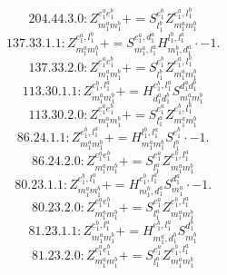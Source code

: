\documentclass[letterpaper,10pt,fleqn,leqno,onecolumn]{article}
\begin{document}
\begin{equation} \;\;\;\;\;\;  204.44.3.0: Z^{e_{1}^{a}e_{1}^{b}}_{m_{1}^{a}m_{1}^{b}}+=S^{e_{1}^{b}}_{l_{1}^{b}}Z^{e_{1}^{a},l_{1}^{b}}_{m_{1}^{a}m_{1}^{b}} \end{equation}
\begin{equation} \;\;\;\;\;\;  137.33.1.1: Z^{e_{1}^{a},l_{1}^{b}}_{m_{1}^{a}m_{1}^{b}}+=S^{e_{1}^{a},d_{1}^{a}}_{m_{1}^{a},l_{1}^{a}}H^{l_{1}^{b},l_{1}^{a}}_{m_{1}^{b},d_{1}^{a}}\cdot -1. \end{equation}
\begin{equation} \;\;\;\;\;\;  137.33.2.0: Z^{e_{1}^{a}e_{1}^{b}}_{m_{1}^{a}m_{1}^{b}}+=S^{e_{1}^{b}}_{l_{1}^{b}}Z^{e_{1}^{a},l_{1}^{b}}_{m_{1}^{a}m_{1}^{b}} \end{equation}
\begin{equation} \;\;\;\;\;\;  113.30.1.1: Z^{e_{1}^{b},l_{1}^{a}}_{m_{1}^{a}m_{1}^{b}}+=H^{e_{1}^{b},l_{1}^{a}}_{d_{1}^{a}d_{1}^{b}}S^{d_{1}^{a}d_{1}^{b}}_{m_{1}^{a}m_{1}^{b}} \end{equation}
\begin{equation} \;\;\;\;\;\;  113.30.2.0: Z^{e_{1}^{a}e_{1}^{b}}_{m_{1}^{a}m_{1}^{b}}+=S^{e_{1}^{a}}_{l_{1}^{a}}Z^{e_{1}^{b},l_{1}^{a}}_{m_{1}^{a}m_{1}^{b}} \end{equation}
\begin{equation} \;\;\;\;\;\;  86.24.1.1: Z^{e_{1}^{b},l_{1}^{a}}_{m_{1}^{a}m_{1}^{b}}+=H^{l_{1}^{b},l_{1}^{a}}_{m_{1}^{a}m_{1}^{b}}S^{e_{1}^{b}}_{l_{1}^{b}}\cdot -1. \end{equation}
\begin{equation} \;\;\;\;\;\;  86.24.2.0: Z^{e_{1}^{a}e_{1}^{b}}_{m_{1}^{a}m_{1}^{b}}+=S^{e_{1}^{a}}_{l_{1}^{a}}Z^{e_{1}^{b},l_{1}^{a}}_{m_{1}^{a}m_{1}^{b}} \end{equation}
\begin{equation} \;\;\;\;\;\;  80.23.1.1: Z^{e_{1}^{b},l_{1}^{a}}_{m_{1}^{a}m_{1}^{b}}+=H^{e_{1}^{b},l_{1}^{a}}_{m_{1}^{b},d_{1}^{a}}S^{d_{1}^{a}}_{m_{1}^{a}}\cdot -1. \end{equation}
\begin{equation} \;\;\;\;\;\;  80.23.2.0: Z^{e_{1}^{a}e_{1}^{b}}_{m_{1}^{a}m_{1}^{b}}+=S^{e_{1}^{a}}_{l_{1}^{a}}Z^{e_{1}^{b},l_{1}^{a}}_{m_{1}^{a}m_{1}^{b}} \end{equation}
\begin{equation} \;\;\;\;\;\;  81.23.1.1: Z^{e_{1}^{b},l_{1}^{a}}_{m_{1}^{a}m_{1}^{b}}+=H^{e_{1}^{b},l_{1}^{a}}_{m_{1}^{a},d_{1}^{b}}S^{d_{1}^{b}}_{m_{1}^{b}} \end{equation}
\begin{equation} \;\;\;\;\;\;  81.23.2.0: Z^{e_{1}^{a}e_{1}^{b}}_{m_{1}^{a}m_{1}^{b}}+=S^{e_{1}^{a}}_{l_{1}^{a}}Z^{e_{1}^{b},l_{1}^{a}}_{m_{1}^{a}m_{1}^{b}} \end{equation}
\end{document}

